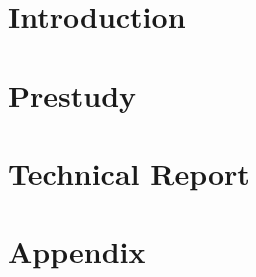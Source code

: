 




\hypersetup{linkcolor=black}
\setcounter{tocdepth}{1}



\tableofcontents

\part{Introduction}





\part{Prestudy}







\part{Technical Report}

%





\part{Appendix}
\begin{appendices}

% 
% 

% 

\printglossaries

\end{appendices}


